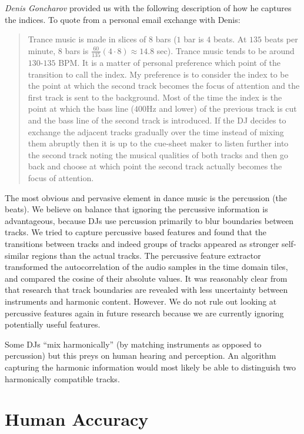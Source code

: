 \documentclass[twocolumn]{article}
\begin{document}
	\textit{Denis Goncharov} provided us with the following description of how he captures the indices. To quote from a personal email exchange with Denis:
	
	\begin{quote}
		Trance music is made in slices of $8$ bars ($1$ bar is $4$ beats. At $135$ beats per minute, $8$ bars is $\frac{60}{135} ( 4 \cdot 8 ) \approx 14.8$ sec). Trance music tends to be around $130$-$135$ BPM. It is a matter of personal preference which point of the transition to call the index. My preference is to consider the index to be the point at which the second track becomes the focus of attention and the first track is sent to the background. Most of the time the index is the point at which the bass line ($400$Hz and lower) of the previous track is cut and the bass line of the second track is introduced. If the DJ decides to exchange the adjacent tracks gradually over the time instead of mixing them abruptly then it is up to the cue-sheet maker to listen further into the second track noting the musical qualities of both tracks and then go back and choose at which point the second track actually becomes the focus of attention.
	\end{quote}
	
	The most obvious and pervasive element in dance music is the percussion (the beats). We believe on balance that ignoring the percussive information is advantageous, because DJs use percussion primarily to blur boundaries between tracks.  We tried to capture percussive based features and found that the transitions between tracks and indeed groups of tracks appeared as stronger self-similar regions than the actual tracks. The percussive feature extractor transformed the autocorrelation of the audio samples in the time domain tiles, and compared the cosine of their absolute values. It was reasonably clear from that  research that track boundaries are revealed with less uncertainty between instruments and harmonic content. However. We do not rule out looking at percussive features again in future research because we are currently ignoring potentially useful features.
	
	Some DJs ``mix harmonically'' (by matching instruments as opposed to percussion) but this preys on human hearing and perception. An algorithm capturing the harmonic information would most likely be able to distinguish two harmonically compatible tracks. 
	
	\section{Human Accuracy}\label{human_acc}
	
\end{document}

